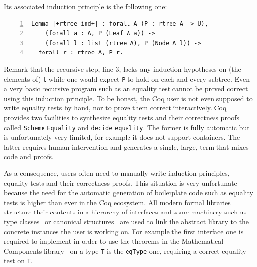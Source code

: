\documentclass[a4paper,UKenglish,cleveref, autoref]{lipics-v2019}
\begin{document}
\noindent
Its associated induction principle is the following one:

\begin{lstlisting}[numbers=left]
Lemma |+rtree_ind+| : forall A (P : rtree A -> U),
    (forall a : A, P (Leaf A a)) ->
    (forall l : list (rtree A), P (Node A l)) ->
  forall r : rtree A, P r.
\end{lstlisting}

Remark that the recursive step, line 3, lacks any induction hypotheses
on (the elements of) \lstinline+l+ while one would expect
\lstinline+P+ to hold on each and every subtree. Even a very basic
recursive program such as an equality test cannot be proved correct
using this induction principle.
To be honest, the Coq
user is not even supposed to write equality tests by hand, nor to prove
them correct interactively.  Coq provides two facilities to synthesize
equality tests and their correctness proofs called 
\lstinline+Scheme+ \lstinline+Equality+ and
\lstinline+decide+ \lstinline+equality+. 
The former is fully
automatic but is unfortunately very limited, for example it does not support
containers.  The latter requires human intervention 
and generates a single, large, term that mixes code and proofs.

As a consequence, %
users often need to manually write induction principles,
equality tests and their correctness proofs.
This situation is very unfortunate because the need for the automatic
generation of boilerplate code such as equality tests
is higher than ever in the Coq ecosystem.
All modern formal libraries structure their contents in a
hierarchy of interfaces and some machinery such as type
classes~\cite{Sozeau:2008:FTC:1459784.1459810} or
canonical structures~\cite{10.1007/978-3-642-39634-2_5}
are used to link the abstract library to the
concrete instances the user is working on.
For example the first interface one
is required to implement in order to use the theorems in the Mathematical
Components library~\cite{mcb} on a type \lstinline+T+ is the \lstinline+eqType+
one, requiring a correct equality test on \lstinline+T+.

\end{document}
